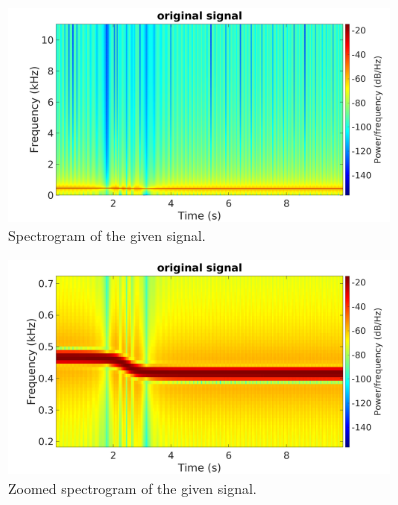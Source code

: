 \begin{figure}[H]
	\centering
	\includegraphics[width=0.9\textwidth]{figs/ex1_spectrogram2_orig.png}
	\caption{Spectrogram of the given signal.}
	\label{fig:spectrogram2_original}
\end{figure}


\begin{figure}[H]
	\centering
	\includegraphics[width=0.9\textwidth]{figs/ex1_spectrogram2_zoomed_orig.png}
	\caption{Zoomed spectrogram of the given signal.}
	\label{fig:spectrogram2_zoomed_original}
\end{figure}
